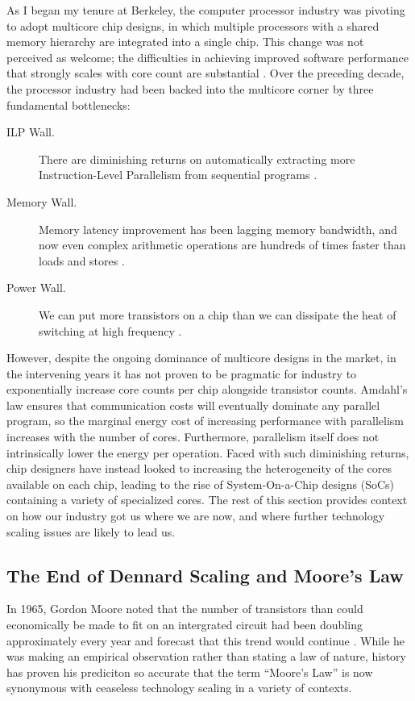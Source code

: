 As I began my tenure at Berkeley, the computer processor industry was pivoting to adopt multicore chip designs,
in which multiple processors with a shared memory hierarchy are integrated into a single chip.
This change was not perceived as welcome; the difficulties in achieving improved software performance that strongly scales with core count are substantial \cite{Asanovic:EECS-2006-183}.
Over the preceding decade, the processor industry had been backed into the multicore corner by three fundamental bottlenecks:
\begin{description}
\item[ILP Wall.] There are diminishing returns on automatically extracting more Instruction-Level Parallelism from sequential programs \cite{hennessy2011computer}.
\item[Memory Wall.] Memory latency improvement has been lagging memory bandwidth, and now even complex arithmetic operations are hundreds of times faster than loads and stores \cite{wulf1995hitting}.
\item[Power Wall.] We can put more transistors on a chip than we can dissipate the heat of switching at high frequency \cite{shacham-micro10}.
\end{description}

However, despite the ongoing dominance of multicore designs in the market, in the intervening years it has not proven to be pragmatic for industry to exponentially increase core counts per chip alongside transistor counts.
Amdahl's law ensures that communication costs will eventually dominate any parallel program, so the marginal energy cost of increasing performance with parallelism increases with the number of cores.
Furthermore, parallelism itself does not intrinsically lower the energy per operation.
Faced with such diminishing returns, chip designers have instead looked to increasing the heterogeneity of the cores available on each chip, leading to the rise of System-On-a-Chip designs (SoCs) containing a variety of specialized cores.
The rest of this section provides context on how our industry got us where we are now, and where further technology scaling issues are likely to lead us.

\subsection{The End of Dennard Scaling and Moore's Law}

In 1965, Gordon Moore noted that the number of transistors than could economically be made to fit on an intergrated circuit had been doubling approximately every year and forecast that this trend would continue \cite{moore2006cramming}.
While he was making an empirical observation rather than stating a law of nature, history has proven his prediciton so accurate that the term ``Moore's Law'' is now synonymous with ceaseless technology scaling in a variety of contexts.

